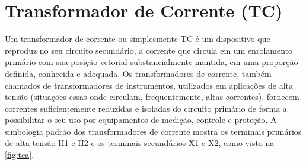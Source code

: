 \documentclass[a5paper,english,spanish,brazil]{ufsc-thesis}
\begin{document}
\section{Transformador de Corrente (TC)}
Um transformador de corrente ou simplesmente TC é um dispositivo que reproduz no seu circuito secundário, a corrente que circula em um enrolamento primário com sua posição vetorial substancialmente mantida, em uma proporção definida, conhecida e adequada. Os transformadores de corrente, também chamados de transformadores de instrumentos, utilizados em aplicações de alta tensão (situações essas onde circulam, frequentemente, altas correntes), fornecem correntes suficientemente reduzidas e isoladas do circuito primário de forma a possibilitar o seu uso por equipamentos de medição, controle e proteção. A simbologia padrão dos transformadores de corrente mostra os terminais primários de alta tensão H1 e H2 e os terminais secundários X1 e X2, como visto na \autoref{fig:tca}.
\end{document}
